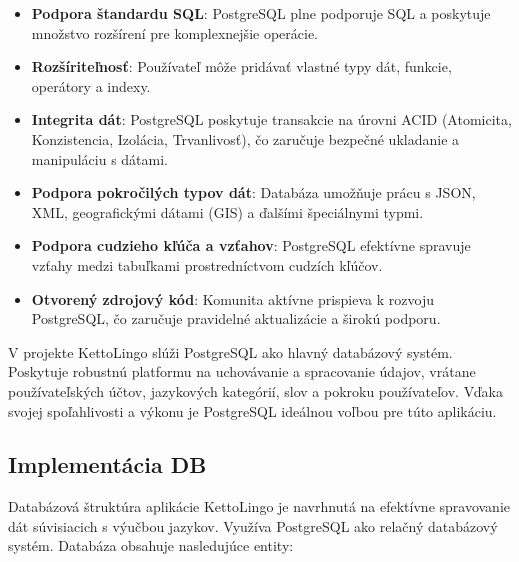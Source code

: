 \documentclass{article}
\begin{document}
\begin{itemize}
    \item \textbf{Podpora štandardu SQL}: PostgreSQL plne podporuje SQL a poskytuje množstvo rozšírení pre komplexnejšie operácie.
    \item \textbf{Rozšíriteľnosť}: Používateľ môže pridávať vlastné typy dát, funkcie, operátory a indexy.
    \item \textbf{Integrita dát}: PostgreSQL poskytuje transakcie na úrovni ACID (Atomicita, Konzistencia, Izolácia, Trvanlivosť), čo zaručuje bezpečné ukladanie a manipuláciu s dátami.
    \item \textbf{Podpora pokročilých typov dát}: Databáza umožňuje prácu s JSON, XML, geografickými dátami (GIS) a ďalšími špeciálnymi typmi.
    \item \textbf{Podpora cudzieho kľúča a vzťahov}: PostgreSQL efektívne spravuje vzťahy medzi tabuľkami prostredníctvom cudzích kľúčov.
    \item \textbf{Otvorený zdrojový kód}: Komunita aktívne prispieva k rozvoju PostgreSQL, čo zaručuje pravidelné aktualizácie a širokú podporu.
\end{itemize}

V projekte KettoLingo slúži PostgreSQL ako hlavný databázový systém. Poskytuje robustnú platformu na uchovávanie a spracovanie údajov, vrátane používateľských účtov, jazykových kategórií, slov a pokroku používateľov. Vďaka svojej spoľahlivosti a výkonu je PostgreSQL ideálnou voľbou pre túto aplikáciu.

\subsection{Implementácia DB}
Databázová štruktúra aplikácie KettoLingo je navrhnutá na efektívne spravovanie dát súvisiacich s výučbou jazykov. Využíva PostgreSQL ako relačný databázový systém. Databáza obsahuje nasledujúce entity:
\end{document}
